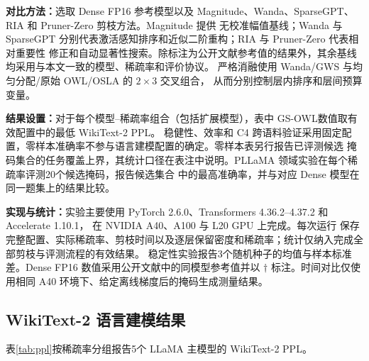 \documentclass[UTF8,fontset=fandol]{ctexart}
\newcommand{\method}{GS-OWL}
\begin{document}
\textbf{对比方法：}选取 Dense FP16 参考模型以及 Magnitude、Wanda、SparseGPT、RIA 和 Pruner-Zero 剪枝方法。Magnitude 提供
无校准幅值基线；Wanda 与 SparseGPT 分别代表激活感知排序和近似二阶重构；RIA 与 Pruner-Zero 代表相对重要性
修正和自动显著性搜索。除标注为公开文献参考值的结果外，其余基线均采用与本文一致的模型、稀疏率和评价协议。
严格消融使用 Wanda/GWS 与均匀分配/原始 OWL/OSLA 的 $2\times3$ 交叉组合，
从而分别控制层内排序和层间预算变量。

\textbf{结果设置：}对于每个模型--稀疏率组合（包括扩展模型），表中 \method 数值取有效配置中的最低 WikiText-2 PPL。
稳健性、效率和 C4 跨语料验证采用固定配置，零样本准确率不参与语言建模配置的确定。零样本表另行报告已评测候选
掩码集合的任务覆盖上界，其统计口径在表注中说明。PLLaMA 领域实验在每个稀疏率评测20个候选掩码，报告候选集合
中的最高准确率，并与对应 Dense 模型在同一题集上的结果比较。

\textbf{实现与统计：}实验主要使用 PyTorch 2.6.0、Transformers 4.36.2--4.37.2 和 Accelerate 1.10.1，
在 NVIDIA A40、A100 与 L20 GPU 上完成。每次运行
保存完整配置、实际稀疏率、剪枝时间以及逐层保留密度和稀疏率；统计仅纳入完成全部剪枝与评测流程的有效结果。
稳定性实验报告3个随机种子的均值与样本标准差。Dense FP16 数值采用公开文献中的同模型参考值并以
$\dagger$ 标注。时间对比仅使用相同 A40 环境下、给定离线梯度后的掩码生成测量结果。

\subsection{WikiText-2 语言建模结果}

表\ref{tab:ppl}按稀疏率分组报告5个 LLaMA 主模型的 WikiText-2 PPL。
\end{document}
